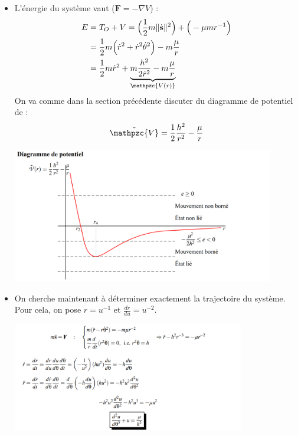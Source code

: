 \documentclass[a4paper]{article}
\begin{document}
\begin{itemize}
\item L'énergie du système vaut ($ \textbf{F} = - \nabla V $) : 
\begin{align*}
E &= T_O + V = \Big( \frac{1}{2} m \| \dot{\textbf{s}} \|^2 \Big) + \Big( - \mu m r^{-1} \Big) \\
&= \frac{1}{2} m \Big( \dot{r}^2 + \dot{r}^2 \dot{\theta}^2 \Big) - m \frac{\mu}{r} \\
&= \frac{1}{2} m \dot{r}^2 + \underbrace{m \frac{h^2}{2 \dot{r}^2} - m \frac{\mu}{r}}_{\mathpzc{V(r)}}
\end{align*}
On va comme dans la section précédente discuter du diagramme de potentiel de : 
\[ \tilde{\mathpzc{V}} = \frac{1}{2} \frac{h^2}{r^2} - \frac{\mu}{r} \]

\begin{center}
\includegraphics[width=0.9\textwidth]{images/forcecentrale.PNG}
\end{center}






\item On cherche maintenant à déterminer exactement la trajectoire du système. Pour cela, on pose $ r = u^{-1} $ et $\displaystyle \frac{d r}{d u} = u^{-2} $.

\begin{center}
\includegraphics[width=0.8\textwidth]{images/trajectoire.PNG}
\end{center}


\end{itemize}
\end{document}
